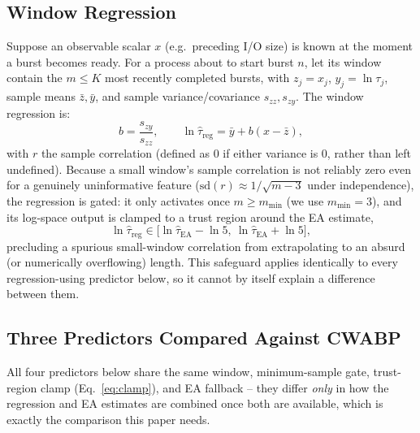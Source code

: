 \documentclass[10pt,twocolumn]{article}
\begin{document}
\subsection{Window Regression}
Suppose an observable scalar $x$ (e.g.\ preceding I/O size) is known at the moment a burst becomes ready. For a process about to start burst $n$, let its window contain the $m\leq K$ most recently completed bursts, with $z_j=x_j$, $y_j=\ln\tau_j$, sample means $\bar z,\bar y$, and sample variance/covariance $s_{zz},s_{zy}$. The window regression is:
\begin{equation}
b = \frac{s_{zy}}{s_{zz}}, \qquad \ln\hat\tau_{\mathrm{reg}} = \bar y + b(x-\bar z),
\label{eq:reg}
\end{equation}
with $r$ the sample correlation (defined as $0$ if either variance is $0$, rather than left undefined). Because a small window's sample correlation is not reliably zero even for a genuinely uninformative feature ($\mathrm{sd}(r)\approx1/\sqrt{m-3}$ under independence), the regression is gated: it only activates once $m\geq m_{\min}$ (we use $m_{\min}{=}3$), and its log-space output is clamped to a trust region around the EA estimate,
\begin{equation}
\ln\hat\tau_{\mathrm{reg}} \in \big[\ln\hat\tau_{\mathrm{EA}}-\ln5,\ \ln\hat\tau_{\mathrm{EA}}+\ln5\big],
\label{eq:clamp}
\end{equation}
precluding a spurious small-window correlation from extrapolating to an absurd (or numerically overflowing) length. This safeguard applies identically to every regression-using predictor below, so it cannot by itself explain a difference between them.

\subsection{Three Predictors Compared Against CWABP}
All four predictors below share the same window, minimum-sample gate, trust-region clamp (Eq.~\ref{eq:clamp}), and EA fallback -- they differ \emph{only} in how the regression and EA estimates are combined once both are available, which is exactly the comparison this paper needs.
\end{document}
